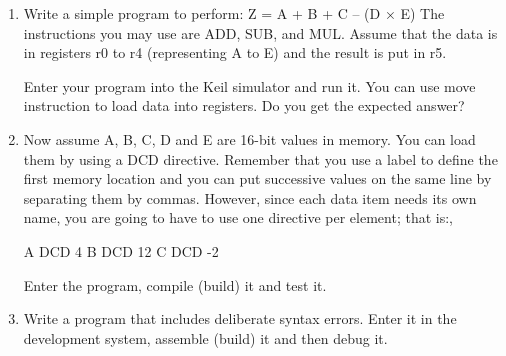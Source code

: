 \documentclass[letterpaper,10pt]{article}
\begin{document}
\begin{enumerate}
    \item Write a simple program to perform: Z = A + B + C – (D × E) 
    The instructions you may use are ADD, SUB, and MUL. Assume that the data is in registers r0 to r4 (representing A to E) and the result is put in r5. 
 
    Enter your program into the Keil simulator and run it. You can use move instruction to load data into registers. Do you get the expected answer?
    \item Now assume A, B, C, D and E are 16-bit values in memory. You can load them by using a DCD directive. Remember that you use a label to define the first memory location and you can put successive values on the same line by separating them by commas. However, since each data item needs its own name, you are going to have to use one directive per element; that is:, 
 
A DCD 4 
B DCD 12 
C DCD -2 
 
Enter the program, compile (build) it and test it. 
    \item Write a program that includes deliberate syntax errors. Enter it in the development system, assemble (build) it and then debug it. 
\end{enumerate}
%
\end{document}
